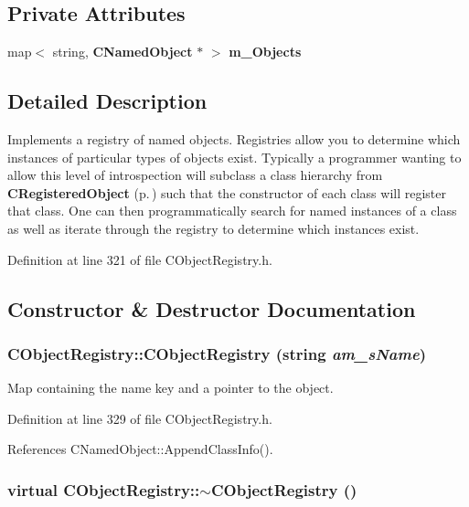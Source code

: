 \subsection*{Private Attributes}
\begin{CompactItemize}
\item 
map$<$ string, {\bf CNamed\-Object} $\ast$ $>$ {\bf m\_\-Objects}
\end{CompactItemize}


\subsection{Detailed Description}
Implements a registry of named objects.  Registries allow you to determine which instances of particular types of objects exist. Typically a programmer wanting to  allow this level of introspection will subclass a class hierarchy from {\bf CRegistered\-Object} {\rm (p.\,\pageref{classCRegisteredObject})} such that the constructor of each class will register that class. One can then programmatically search for named instances of a class as well as iterate through the registry to determine which instances exist. 



Definition at line 321 of file CObject\-Registry.h.

\subsection{Constructor \& Destructor Documentation}
\subsubsection{\setlength{\rightskip}{0pt plus 5cm}CObject\-Registry::CObject\-Registry (string {\em am\_\-s\-Name})\hspace{0.3cm}{\tt  [inline]}}\label{classCObjectRegistry_a0}


Map containing the name key and a pointer to the object. 

Definition at line 329 of file CObject\-Registry.h.

References CNamed\-Object::Append\-Class\-Info().
\subsubsection{\setlength{\rightskip}{0pt plus 5cm}virtual CObject\-Registry::$\sim$CObject\-Registry ()\hspace{0.3cm}{\tt  [inline, virtual]}}\label{classCObjectRegistry_a1}




